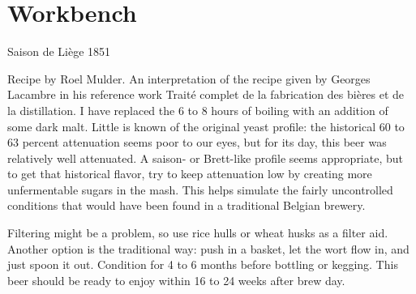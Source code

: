 \documentclass[10pt,oneside]{scrbook}
\begin{document}
\mainmatter
\twocolumn

\part{Workbench}

\begin{recipie}{Saison de Liège 1851}

\begin{aboutblock}
Recipe by Roel Mulder. An interpretation of the recipe given by Georges Lacambre
in his reference work Traité complet de la fabrication des bières et de la
distillation. I have replaced the 6 to 8 hours of boiling with an addition of
some dark malt. Little is known of the original yeast profile: the historical 60
to 63 percent attenuation seems poor to our eyes, but for its day, this beer was
relatively well attenuated. A saison- or Brett-like profile seems appropriate,
but to get that historical flavor, try to keep attenuation low by creating more
unfermentable sugars in the mash. This helps simulate the fairly uncontrolled
conditions that would have been found in a traditional Belgian brewery.
\end{aboutblock}


\begin{methodandtiming}
 
\begin{mashsteps}
\end{mashsteps}

\begin{fermentationsteps}
\end{fermentationsteps}

\begin{directions}
Filtering might be a problem, so use rice hulls or wheat husks as a filter aid. Another
option is the traditional way: push in a basket, let the wort flow in, and just spoon
it out. Condition for 4 to 6 months before bottling or kegging. This beer should be ready
to enjoy within 16 to 24 weeks after brew day.
\end{directions}

\end{methodandtiming}


\end{recipie}
\end{document}
